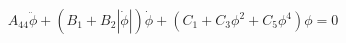 \begin{equation} \label{eq:roll_decay_equation_quadratic_}
A_{44} \ddot{\phi} + \left(B_{1} + B_{2} \left|{\dot{\phi}}\right|\right) \dot{\phi} + \left(C_{1} + C_{3} \phi^{2} + C_{5} \phi^{4}\right) \phi = 0
\end{equation}
